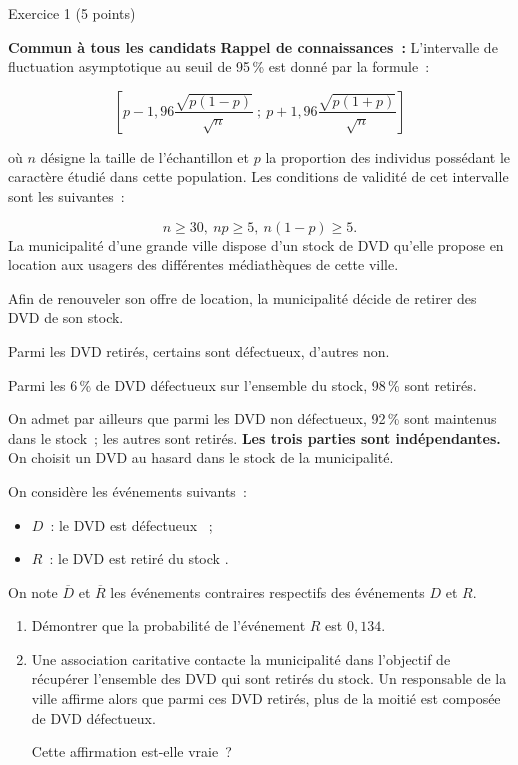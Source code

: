 
\begin{h2}Exercice 1 (5 points)\end{h2}
\textbf{Commun à tous les candidats}
\medbreak
\textbf{Rappel de connaissances~:}
\medbreak
L'intervalle de fluctuation asymptotique au seuil de 95\,\% est donné par la formule~:
\par
\[\left[p- 1,96\dfrac{\sqrt{p(1 - p)}}{\sqrt{n}}~;~p + 1,96\dfrac{\sqrt{p(1 + p)}}{\sqrt{n}}\right]\]
\par
où $n$ désigne la taille de l'échantillon et $p$ la proportion des individus possédant le caractère étudié dans cette population. Les conditions de validité de cet intervalle sont les suivantes~:
\par
\[n \geqslant 30,\: np \geqslant 5,\: n(1 - p) \geqslant 5.\]
\medbreak
\newpage
\medbreak
La municipalité d'une grande ville dispose d'un stock de DVD qu'elle propose en location aux usagers des différentes médiathèques de cette ville.
\par
Afin de renouveler son offre de location, la municipalité décide de retirer des DVD de son stock.
\par
Parmi les DVD retirés, certains sont défectueux, d'autres non.
\par
Parmi les 6\,\% de DVD défectueux sur l'ensemble du stock, 98\,\% sont retirés.
\par
On admet par ailleurs que parmi les DVD non défectueux, 92\,\% sont maintenus dans le stock~; les autres sont retirés.
\medbreak
\textbf{Les trois parties sont indépendantes.}
\bigbreak
{}
\medbreak
On choisit un DVD au hasard dans le stock de la municipalité.
\par
On considère les événements suivants~:
\begin{indent}
     \begin{itemize}
          \item $D$~: \og le DVD est défectueux \fg{}~;
          \item $R$~: \og le DVD est retiré du stock \fg\fg.
     \end{itemize}
\end{indent}
On note $\overline{D}$ et $\overline{R}$ les événements contraires respectifs des événements $D$ et $R$.
\medbreak
\begin{enumerate}
     \item Démontrer que la probabilité de l'événement $R$ est $0,134$.
     \item Une association caritative contacte la municipalité dans l'objectif de récupérer l'ensemble des DVD qui sont retirés du stock. Un responsable de la ville affirme alors que parmi ces DVD retirés, plus de la moitié est composée de DVD défectueux.
     \par
     Cette affirmation est-elle vraie~?
\end{enumerate}
